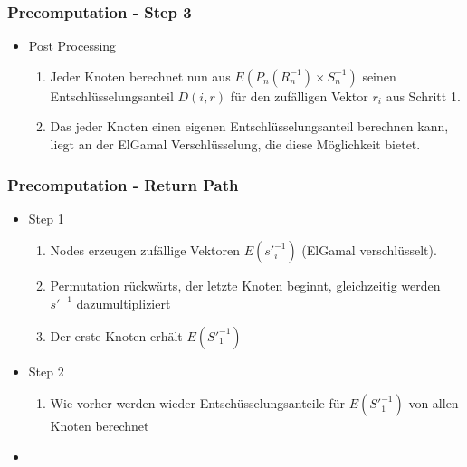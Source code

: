 \documentclass[t, xcolor=dvipsnames]{beamer}
\begin{document}
\begin{frame}
	\frametitle{Precomputation - Step 3}
	\begin{itemize}
		\item Post Processing
		\begin{enumerate}
			\item Jeder Knoten berechnet nun aus $E(P_n(R_n^{-1}) \times S_n^{-1})$ seinen Entschlüsselungsanteil $D(i, r)$ für den zufälligen Vektor $r_i$ aus Schritt 1.
			\item Das jeder Knoten einen eigenen Entschlüsselungsanteil berechnen kann, liegt an der ElGamal Verschlüsselung, die diese Möglichkeit bietet.
		\end{enumerate}
		
	
	\end{itemize}
	\vspace{\fill}
\end{frame}

\begin{frame}
	\frametitle{Precomputation - Return Path}
	\begin{itemize}
		
		\item Step 1
		\begin{enumerate}
			\item Nodes erzeugen zufällige Vektoren $E({s'}_i^{-1})$ (ElGamal verschlüsselt).
			\item Permutation rückwärts, der letzte Knoten beginnt, gleichzeitig werden $s'^{-1}$ dazumultipliziert
			\item Der erste Knoten erhält $E({S'}_1^{-1})$
		\end{enumerate}
		\item Step 2
		\begin{enumerate}
			\item Wie vorher werden wieder Entschüsselungsanteile für $E({S'}_1^{-1})$ von allen Knoten berechnet
		\end{enumerate}
		\item 
		
		 
	\end{itemize}
	\vspace{\fill}
\end{frame}
\end{document}
